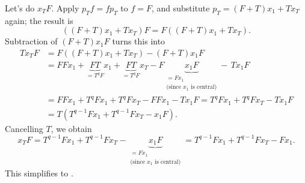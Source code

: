 \documentclass[numbers=enddot,12pt,final,onecolumn,notitlepage]{scrartcl}%
\theoremstyle{definition}
\begin{document}
Let's do $x_{T}F$. Apply $p_{T}f=fp_{T}$ to $f=F$, and substitute
$p_{T}=\left(  F+T\right)  x_{1}+Tx_{T}$ again; the result is%
\[
\left(  \left(  F+T\right)  x_{1}+Tx_{T}\right)  F=F\left(  \left(
F+T\right)  x_{1}+Tx_{T}\right)  .
\]
Subtraction of $\left(  F+T\right)  x_{1}F$ turns this into
\begin{align*}
Tx_{T}F  &  =F\left(  \left(  F+T\right)  x_{1}+Tx_{T}\right)  -\left(
F+T\right)  x_{1}F\\
&  =FFx_{1}+\underbrace{FT}_{=T^{q}F}x_{1}+\underbrace{FT}_{=T^{q}F}%
x_{T}-F\underbrace{x_{1}F}_{\substack{=Fx_{1}\\\text{(since }x_{1}\text{ is
central)}}}-\,Tx_{1}F\\
&  =FFx_{1}+T^{q}Fx_{1}+T^{q}Fx_{T}-FFx_{1}-Tx_{1}F=T^{q}Fx_{1}+T^{q}%
Fx_{T}-Tx_{1}F\\
&  =T\left(  T^{q-1}Fx_{1}+T^{q-1}Fx_{T}-x_{1}F\right)  .
\end{align*}
Cancelling $T$, we obtain%
\[
x_{T}F=T^{q-1}Fx_{1}+T^{q-1}Fx_{T}-\underbrace{x_{1}F}_{\substack{=Fx_{1}%
\\\text{(since }x_{1}\text{ is central)}}} =T^{q-1}Fx_{1}+T^{q-1}Fx_{T}%
-Fx_{1}.
\]
This simplifies to .
\end{document}

